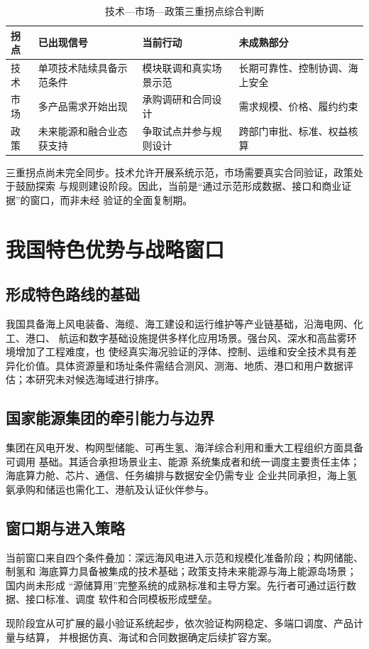 \begin{table}[H]
\centering
\caption{技术—市场—政策三重拐点综合判断}
\label{tab:c2-inflections}
\begin{tabularx}{\textwidth}{p{2cm} X X X}
\toprule
拐点 & 已出现信号 & 当前行动 & 未成熟部分\\
\midrule
技术 & 单项技术陆续具备示范条件 & 模块联调和真实场景示范 & 长期可靠性、控制协调、海上安全\\
市场 & 多产品需求开始出现 & 承购调研和合同设计 & 需求规模、价格、履约约束\\
政策 & 未来能源和融合业态获支持 & 争取试点并参与规则设计 & 跨部门审批、标准、权益核算\\
\bottomrule
\end{tabularx}
\end{table}

三重拐点尚未完全同步。技术允许开展系统示范，市场需要真实合同验证，政策处于鼓励探索
与规则建设阶段。因此，当前是“通过示范形成数据、接口和商业证据”的窗口，而非未经
验证的全面复制期。

\section{我国特色优势与战略窗口}

\subsection{形成特色路线的基础}

我国具备海上风电装备、海缆、海工建设和运行维护等产业链基础，沿海电网、化工、港口、
航运和数字基础设施提供多样化应用场景。强台风、深水和高盐雾环境增加了工程难度，也
使经真实海况验证的浮体、控制、运维和安全技术具有差异化价值。具体资源量和场址条件需结合测风、测海、地质、港口和用户数据评估；本研究未对候选海域进行排序。

\subsection{国家能源集团的牵引能力与边界}

集团在风电开发、构网型储能、可再生氢、海洋综合利用和重大工程组织方面具备可调用
基础\cite{chnenergy-new-productivity,chnenergy-hydrogen}。其适合承担场景业主、能源
系统集成者和统一调度主要责任主体；海底算力舱、芯片、通信、任务编排与数据安全仍需专业
企业共同承担，海上氢氨承购和储运也需化工、港航及认证伙伴参与。

\subsection{窗口期与进入策略}

当前窗口来自四个条件叠加：深远海风电进入示范和规模化准备阶段；构网储能、制氢和
海底算力具备被集成的技术基础；政策支持未来能源与海上能源岛场景；国内尚未形成
“源储算用”完整系统的成熟标准和主导方案。先行者可通过运行数据、接口标准、调度
软件和合同模板形成壁垒。

现阶段宜从可扩展的最小验证系统起步，依次验证构网稳定、多端口调度、产品计量与结算，
并根据仿真、海试和合同数据确定后续扩容方案。


